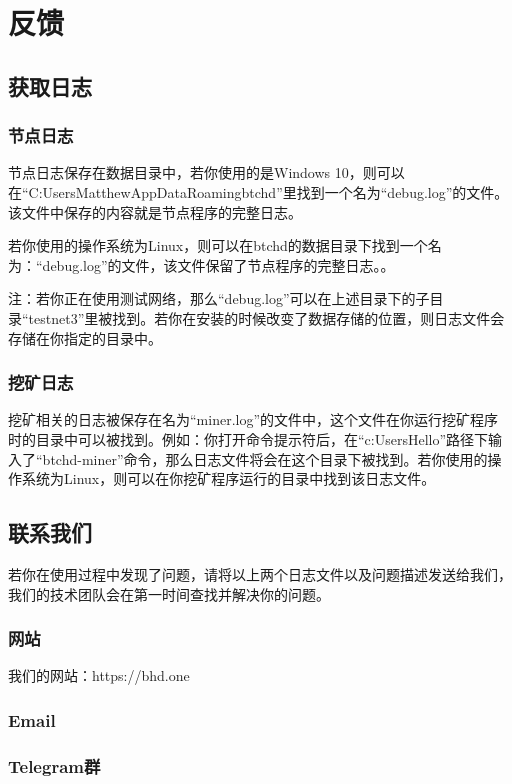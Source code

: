 \chapter{反馈}
\section{获取日志}
\subsection{节点日志}
\begin{flushleft}
    节点日志保存在数据目录中，若你使用的是Windows 10，则可以在``C:UsersMatthewAppDataRoamingbtchd''里找到一个名为``debug.log''的文件。该文件中保存的内容就是节点程序的完整日志。
\end{flushleft}
\begin{flushleft}
    若你使用的操作系统为Linux，则可以在btchd的数据目录下找到一个名为：``debug.log''的文件，该文件保留了节点程序的完整日志。。
\end{flushleft}
\small
\begin{flushleft}
    注：若你正在使用测试网络，那么``debug.log''可以在上述目录下的子目录``testnet3''里被找到。若你在安装的时候改变了数据存储的位置，则日志文件会存储在你指定的目录中。
\end{flushleft}
\normalsize
\subsection{挖矿日志}
\begin{flushleft}
    挖矿相关的日志被保存在名为``miner.log''的文件中，这个文件在你运行挖矿程序时的目录中可以被找到。例如：你打开命令提示符后，在``c:UsersHello''路径下输入了``btchd-miner''命令，那么日志文件将会在这个目录下被找到。若你使用的操作系统为Linux，则可以在你挖矿程序运行的目录中找到该日志文件。
\end{flushleft}
\section{联系我们}
\begin{flushleft}
    若你在使用过程中发现了问题，请将以上两个日志文件以及问题描述发送给我们，我们的技术团队会在第一时间查找并解决你的问题。
\end{flushleft}
\subsection{网站}
\begin{flushleft}
    我们的网站：https://bhd.one
\end{flushleft}
\subsection{Email}
\subsection{Telegram群}
